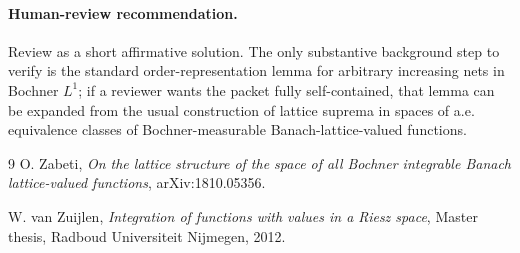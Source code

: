 \documentclass[11pt]{article}
\begin{document}
\paragraph{Human-review recommendation.}
Review as a short affirmative solution.  The only substantive background step
to verify is the standard order-representation lemma for arbitrary increasing
nets in Bochner $L^1$; if a reviewer wants the packet fully self-contained,
that lemma can be expanded from the usual construction of lattice suprema in
spaces of a.e. equivalence classes of Bochner-measurable Banach-lattice-valued
functions.

\begin{thebibliography}{9}
O. Zabeti,
\emph{On the lattice structure of the space of all Bochner integrable Banach
lattice-valued functions},
arXiv:1810.05356.

W. van Zuijlen,
\emph{Integration of functions with values in a Riesz space},
Master thesis, Radboud Universiteit Nijmegen, 2012.
\end{thebibliography}
\end{document}
